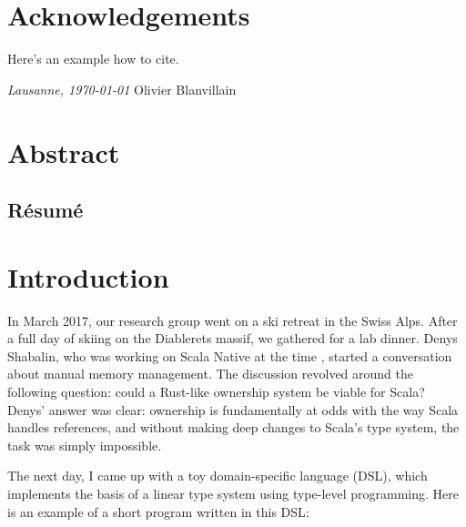 



\frontmatter

\setcounter{page}{0}

\chapter{Acknowledgements}
\lipsum[1-2]
Here's an example how to cite.

\bigskip
\noindent\textit{Lausanne, \today}
\hfill Olivier Blanvillain

\cleardoublepage
\chapter*{Abstract}
\lipsum[1-2] %
\begin{otherlanguage}{french}
\cleardoublepage
\chapter*{Résumé}
\lipsum[1-2]
\end{otherlanguage}

\tableofcontents

\cleardoublepage
{}
{}
\listoffigures
\mainmatter


\chapter{Introduction}
\label{chap:introduction}

In March 2017, our research group went on a ski retreat in the Swiss Alps.
After a full day of skiing on the Diablerets massif, we gathered for a lab dinner.
Denys Shabalin, who was working on Scala Native at the time \citep{shabalin2020just}, started a conversation about manual memory management.
The discussion revolved around the following question: could a Rust-like ownership system be viable for Scala?
Denys' answer was clear: ownership is fundamentally at odds with the way Scala handles references, and without making deep changes to Scala's type system, the task was simply impossible.

The next day, I came up with a toy domain-specific language (DSL), which implements the basis of a linear type system using type-level programming.
Here is an example of a short program written in this DSL:

